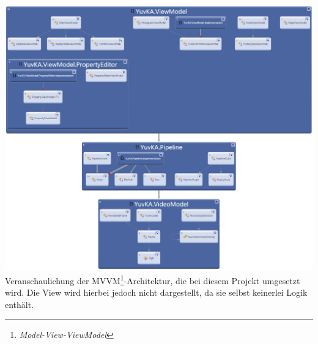 \includegraphics[width=\textwidth]{Diagrams/namespacedependencies.png}
Veranschaulichung der MVVM\footnote{\emph{Model-View-ViewModel}}-Architektur, die bei diesem Projekt umgesetzt wird. Die View wird hierbei jedoch nicht dargestellt, da sie selbst keinerlei Logik enthält.
